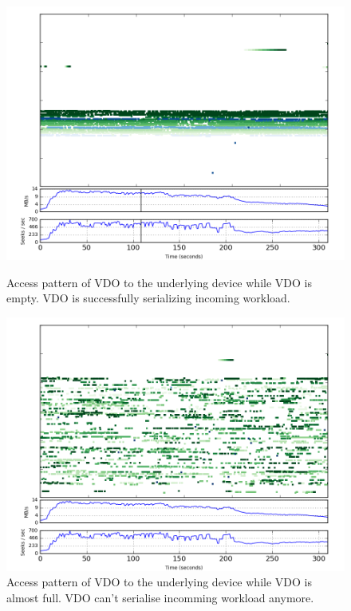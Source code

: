 \documentclass[
  color, %
  table, %
  lof,   %
  lot,   %
]{fithesis3}
\begin{document}
\begin{figure}[!htb]
        \centering
        \includegraphics[width=\textwidth]{../results/half/start}
\caption[Access pattern of VDO with enough free space]{Access pattern of VDO to the underlying device while VDO is empty. VDO is successfully serializing incoming workload.}
\label{fig:half-start}
        \centering
        \includegraphics[width=\textwidth]{../results/half/end}
\caption[Access pattern of VDO running out of free space]{Access pattern of VDO to the underlying device while VDO is almost full. VDO can't serialise incomming workload anymore.}
\label{fig:half-end}
\end{figure}

\end{document}
